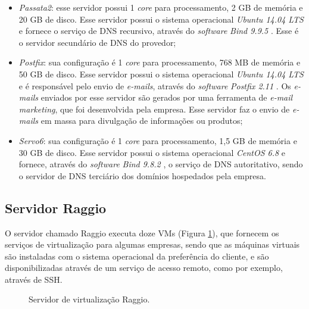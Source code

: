 \begin{itemize}
 \item \textit{Passata2}: esse servidor possui 1 \textit{core} para processamento, 2 GB de memória e 20 GB de disco. Esse servidor possui o 
 sistema operacional \textit{Ubuntu 14.04 \ac{LTS}} \cite{ubuntu} e fornece o serviço de \ac{DNS} recursivo, através do \textit{software} 
 \textit{Bind 9.9.5} \cite{bind}. Esse é o servidor secundário de \ac{DNS} do provedor;
 
 \item \textit{Postfix}: sua configuração é 1 \textit{core} para processamento, 768 MB de memória e 50 GB de disco. Esse servidor possui o 
 sistema operacional \textit{Ubuntu 14.04 \ac{LTS}} \cite{ubuntu} e é responsável pelo envio de \textit{e-mails}, através do \textit{software} 
 \textit{Postfix 2.11} \cite{postfix}. Os \textit{e-mails} enviados por esse servidor são gerados por uma ferramenta de \textit{e-mail marketing}, que foi
 desenvolvida pela empresa. Esse servidor faz o envio de \textit{e-mails} em massa para divulgação de informações ou produtos;
 
 \item \textit{Servo6}: sua configuração é 1 \textit{core} para processamento, 1,5 GB de memória e 30 GB de disco. Esse servidor possui o 
 sistema operacional \textit{CentOS 6.8} e fornece, através do \textit{software} \textit{Bind 9.8.2} \cite{bind}, o serviço de \ac{DNS} 
 autoritativo, sendo o servidor de \ac{DNS} terciário dos domínios hospedados pela empresa.
\end{itemize}

\subsection{Servidor Raggio}
\label{section:serv_raggio}

O servidor chamado Raggio executa doze \ac{VM}s (Figura \ref{fig:servidor_raggio}), que fornecem os serviços de virtualização para algumas empresas,
sendo que as máquinas virtuais são instaladas com o sistema operacional da preferência do cliente, e são disponibilizadas através de um serviço 
de acesso remoto, como por exemplo, através de \ac{SSH}.

\begin{figure}[h!]
 \centering
 \caption{Servidor de virtualização Raggio.}
 \label{fig:servidor_raggio}
\end{figure}

